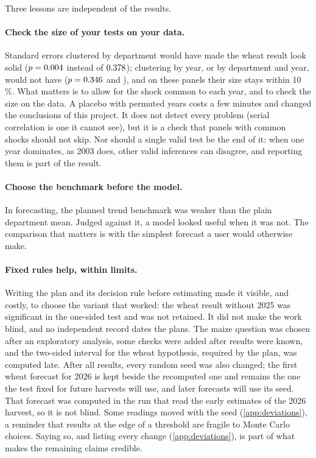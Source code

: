 Three lessons are independent of the results.

\paragraph{Check the size of your tests on your data.} Standard errors clustered by department would have made the wheat result look solid ($p = 0.004$ instead of $0.378$); clustering by year, or by department and year, would not have ($p = 0.346$ and \WheatPtwo), and on these panels their size stays within 10\,\%. What matters is to allow for the shock common to each year, and to check the size on the data. A placebo with permuted years costs a few minutes and changed the conclusions of this project. It does not detect every problem (serial correlation is one it cannot see), but it is a check that panels with common shocks should not skip. Nor should a single valid test be the end of it: when one year dominates, as 2003 does, other valid inferences can disagree, and reporting them is part of the result.

\paragraph{Choose the benchmark before the model.} In forecasting, the planned trend benchmark was weaker than the plain department mean. Judged against it, a model looked useful when it was not. The comparison that matters is with the simplest forecast a user would otherwise make.

\paragraph{Fixed rules help, within limits.} Writing the plan and its decision rule before estimating made it visible, and costly, to choose the variant that worked: the wheat result without 2025 was significant in the one-sided test and was not retained. It did not make the work blind, and no independent record dates the plans. The maize question was chosen after an exploratory analysis, some checks were added after results were known, and the two-sided interval for the wheat hypothesis, required by the plan, was computed late. After all results, every random seed was also changed; the first wheat forecast for 2026 is kept beside the recomputed one and remains the one the test fixed for future harvests will use, and later forecasts will use its seed. That forecast was computed in the run that read the early estimates of the 2026 harvest, so it is not blind. Some readings moved with the seed (\cref{app:deviations}), a reminder that results at the edge of a threshold are fragile to Monte Carlo choices. Saying so, and listing every change (\cref{app:deviations}), is part of what makes the remaining claims credible.
